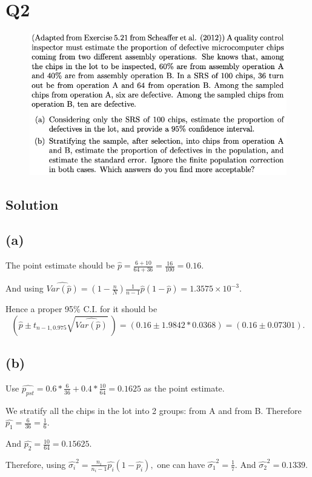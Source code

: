 \documentclass[12pt]{article}%
\begin{document}
\section{Q2}
\begin{figure}[htp]
    \includegraphics[width = 15cm]{img/Q2.png}
\end{figure}
\subsection*{Solution}
\subsection{(a)}
The point estimate should be $\hat{p}=\frac{6+10}{64+36}=\frac{16}{100}=0.16.$

And using $\widehat{Var(\hat{p})}=(1-\frac{n}{N})\frac{1}{n-1}\hat{p}(1-\hat{p})=1.3575\times 10^{-3}.$

Hence a proper 95\% C.I. for it should be $$(\hat{p} \pm t_{n-1,0.975}\sqrt{\widehat{Var(\hat{p})}}~)=(0.16 \pm 1.9842*0.0368)=(0.16 \pm 0.07301).$$

\subsection{(b)}
Use $\widehat{p_{pst}}=0.6*\frac{6}{36}+0.4*\frac{10}{64}=0.1625$ as the point estimate.


We stratify all the chips in the lot into 2 groups: from A and from B. 
Therefore $\hat{p_1}=\frac{6}{36}=\frac{1}{6}.$

And $\hat{p_2}=\frac{10}{64}=0.15625.$

Therefore, using $\hat{\sigma_i}^2=\frac{n_i}{n_i-1}\hat{p_i}(1-\hat{p_i}),$ one can
have $\hat{\sigma_1}^2=\frac{1}{7}.$ And $\hat{\sigma_2}^2=0.1339.$
\end{document}
